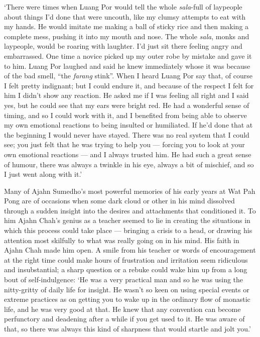 `There were times when Luang Por would tell the whole \emph{sala}-full
of laypeople about things I'd done that were uncouth, like my clumsy
attempts to eat with my hands. He would imitate me making a ball of
sticky rice and then making a complete mess, pushing it into my mouth
and nose. The whole \emph{sala}, monks and laypeople, would be roaring
with laughter. I'd just sit there feeling angry and embarrassed. One
time a novice picked up my outer robe by mistake and gave it to him.
Luang Por laughed and said he knew immediately whose it was because of
the bad smell, ``the \emph{farang} stink''. When I heard Luang Por say
that, of course I felt pretty indignant; but I could endure it, and
because of the respect I felt for him I didn't show any reaction. He
asked me if I was feeling all right and I said yes, but he could see
that my ears were bright red. He had a wonderful sense of timing, and so
I could work with it, and I benefited from being able to observe my own
emotional reactions to being insulted or humiliated. If he'd done that
at the beginning I would never have stayed. There was no real system
that I could see; you just felt that he was trying to help you ---
forcing you to look at your own emotional reactions --- and I always
trusted him. He had such a great sense of humour, there was always a
twinkle in his eye, always a bit of mischief, and so I just went along
with it.'

Many of Ajahn Sumedho's most powerful memories of his early years at Wat
Pah Pong are of occasions when some dark cloud or other in his mind
dissolved through a sudden insight into the desires and attachments that
conditioned it. To him Ajahn Chah's genius as a teacher seemed to lie in
creating the situations in which this process could take place ---
bringing a crisis to a head, or drawing his attention most skilfully to
what was really going on in his mind. His faith in Ajahn Chah made him
open. A smile from his teacher or words of encouragement at the right
time could make hours of frustration and irritation seem ridiculous and
insubstantial; a sharp question or a rebuke could wake him up from a
long bout of self-indulgence: `He was a very practical man and so he was
using the nitty-gritty of daily life for insight. He wasn't so keen on
using special events or extreme practices as on getting you to wake up
in the ordinary flow of monastic life, and he was very good at that. He
knew that any convention can become perfunctory and deadening after a
while if you get used to it. He was aware of that, so there was always
this kind of sharpness that would startle and jolt you.'


